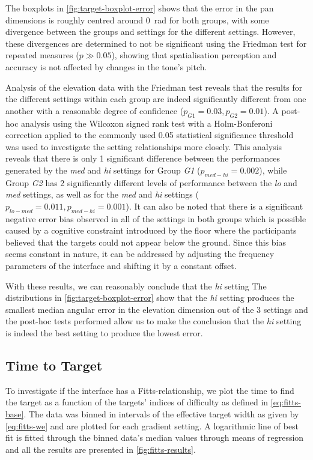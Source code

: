 \documentclass{article}
\begin{document}
The boxplots in \cref{fig:target-boxplot-error} shows that the error in the pan dimensions is roughly centred around \SI{0}{\radian} for both groups, with some divergence between the groups and settings for the different settings.
However, these divergences are determined to not be significant using the Friedman test for repeated measures ($p \gg 0.05$), showing that spatialisation perception and accuracy is not affected by changes in the tone's pitch.

Analysis of the elevation data with the Friedman test reveals that the results for the different settings within each group are indeed significantly different from one another with a reasonable degree of confidence ($p_{G1} = 0.03, p_{G2} = 0.01$).
A post-hoc analysis using the Wilcoxon signed rank test with a Holm-Bonferoni correction applied to the commonly used 0.05 statistical significance threshold was used to investigate the setting relationships more closely. 
This analysis reveals that there is only 1 significant difference between the performances generated by the \textit{med} and \textit{hi} settings for Group \textit{G1} ($p_{med-hi} = 0.002$), while Group \textit{G2} has 2 significantly different levels of performance between the \textit{lo} and \textit{med} settings, as well as for the \textit{med} and \textit{hi} settings ($p_{lo-med} = 0.011, p_{med-hi} = 0.001$).
It can also be noted that there is a significant negative error bias observed in all of the settings in both groups which is possible caused by a cognitive constraint introduced by the floor where the participants believed that the targets could not appear below the ground.
Since this bias seems constant in nature, it can be addressed by adjusting the frequency parameters of the interface and shifting it by a constant offset. 

With these results, we can reasonably conclude that the \textit{hi} setting  
The distributions in \cref{fig:target-boxplot-error} show that the \textit{hi} setting produces the smallest median angular error in the elevation dimension out of the 3 settings and the post-hoc tests performed allow us to make the conclusion that the \textit{hi} setting is indeed the best setting to produce the lowest error. 

\subsection{Time to Target}

To investigate if the interface has a Fitts-relationship, we plot the time to find the target as a function of the targets' indices of difficulty as defined in \cref{eq:fitts-base}.
The data was binned in intervals of the effective target width as given by \cref{eq:fitts-we} and are plotted for each gradient setting. 
A logarithmic line of best fit is fitted through the binned data's median values through means of regression and all the results are presented in \cref{fig:fitts-results}.
\end{document}
